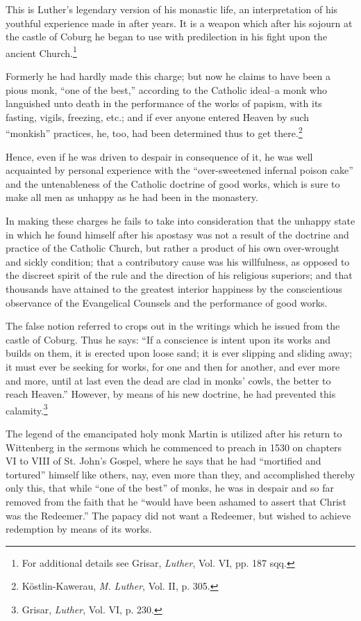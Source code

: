 This is Luther’s legendary version of his monastic life, an interpretation
of his youthful experience made in after years. It is a
weapon which after his sojourn at the castle of Coburg he began to
use with predilection in his fight upon the ancient Church.\footnote
{For additional details see Grisar, \textit{Luther}, Vol. VI, pp. 187 sqq.}

Formerly he had hardly made this charge; but now he claims to have been
a pious monk, “one of the best,” according to the Catholic ideal--a monk
who languished unto death in the performance of the works of papism, with
its fasting, vigils, freezing, etc.; and if ever anyone entered Heaven by such
“monkish” practices, he, too, had been determined thus to get there.\footnote{Köstlin-Kawerau, \textit{M. Luther}, Vol. II, p. 305.}

Hence, even if he was driven to despair in consequence of it, he was well acquainted
by personal experience with the “over-sweetened infernal poison cake” and
the untenableness of the Catholic doctrine of good works, which is sure to
make all men as unhappy as he had been in the monastery.

In making these charges he fails to take into consideration that the unhappy
state in which he found himself after his apostasy was not a result of
the doctrine and practice of the Catholic Church, but rather a product of
his own over-wrought and sickly condition; that a contributory cause was
his willfulness, as opposed to the discreet spirit of the rule and the direction
of his religious superiors; and that thousands have attained to the greatest
interior happiness by the conscientious observance of the Evangelical
Counsels and the performance of good works.

The false notion referred to crops out in the writings which he issued
from the castle of Coburg. Thus he says: “If a conscience is intent upon its
works and builds on them, it is erected upon loose sand; it is ever slipping
and sliding away; it must ever be seeking for works, for one and then for
another, and ever more and more, until at last even the dead are clad in
monks’ cowls, the better to reach Heaven.” However, by means of his new
doctrine, he had prevented this calamity.\footnote{Grisar, \textit{Luther}, Vol. VI, p. 230.}

The legend of the emancipated
holy monk Martin is utilized after his return to Wittenberg in the sermons
which he commenced to preach in 1530 on chapters VI to VIII of St. John’s
Gospel, where he says that he had “mortified and tortured” himself like
others, nay, even more than they, and accomplished thereby only this, that
while “one of the best” of monks, he was in despair and so far removed from
the faith that he “would have been ashamed to assert that Christ was the
Redeemer.” The papacy did not want a Redeemer, but wished to achieve redemption
by means of its works.

